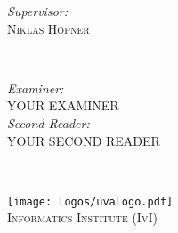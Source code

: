 \documentclass[../main.tex]{subfiles}
\begin{document}
\begin{titlepage}
    \begin{minipage}[t]{0.4\textwidth}
        \begin{flushleft} \large
            \emph{Supervisor:} \\
            \textsc{Niklas Höpner}
        \end{flushleft}
    \end{minipage}
    ~
    \begin{minipage}[t]{0.4\textwidth}
        \begin{flushright} \large
            \emph{Examiner:} \\
            \textsc{YOUR EXAMINER} \\
            \vspace{0.5cm}
            \emph{Second Reader:} \\
            \textsc{YOUR SECOND READER}
        \end{flushright}
    \end{minipage}\\[2cm]

    \vfill %

    \texttt{[image: logos/uvaLogo.pdf]}\\[0.5cm] %
    \textsc{\large Informatics Institute (IvI)}\\[1.0cm] %


\end{titlepage}
\end{document}
